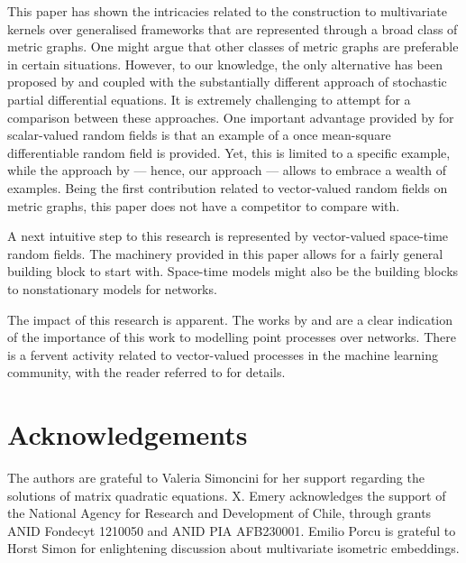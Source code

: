 \documentclass[12pt]{article}
\theoremstyle{plain}
\theoremstyle{remark}
\begin{document}
This paper has shown the intricacies related to the construction to multivariate kernels over generalised frameworks that are represented through a broad class of metric graphs. One might argue that other classes of metric graphs are preferable in certain situations. However, to our knowledge, the only alternative has been proposed by \cite{bolin2022gaussian} and coupled with the substantially different approach of stochastic partial differential equations. It is extremely challenging to attempt for a comparison between these approaches. One important advantage provided by \cite{bolin2022gaussian} for scalar-valued random fields is that an example of a once mean-square differentiable random field is provided. Yet, this is limited to a specific example, while the approach by \cite{anderes_isotropic_2020} --- hence, our approach --- allows to embrace a wealth of examples. Being the first contribution related to vector-valued random fields on metric graphs,  this paper does not have a competitor to compare with. \par
A next intuitive step to this research is represented by vector-valued space-time random fields. The machinery provided in this paper allows for a fairly general building block to start with. Space-time models might also be the building blocks to nonstationary models for networks. \par
The impact of this research is apparent. The works by \cite{baddeley2017stationary} and \cite{moradi} are a clear indication of the importance of this work to modelling point processes over networks. There is a fervent activity related to vector-valued processes in the machine learning community, with the reader referred to \cite{borovitskiy2022isotropic} for details. 


\section*{Acknowledgements}
    The authors are grateful to Valeria Simoncini for her support regarding the solutions of matrix quadratic equations. X. Emery acknowledges the support of the National Agency for Research and Development of Chile, through grants ANID Fondecyt 1210050 and ANID PIA AFB230001. Emilio Porcu is grateful to Horst Simon for enlightening discussion about multivariate isometric embeddings.    
\end{document}

